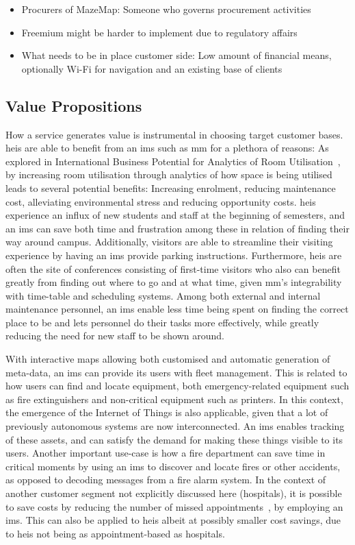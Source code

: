 \begin{itemize}
    \item Procurers of MazeMap: Someone who governs procurement activities
    \item Freemium might be harder to implement due to regulatory affairs
    \item What needs to be in place customer side: Low amount of financial means, optionally Wi-Fi for navigation and an existing base of clients
\end{itemize}

\subsection{Value Propositions}
How a service generates value is instrumental in choosing target customer bases. \glspl{hei} are able to benefit from an \gls{ims} such as \gls{mm} for a plethora of reasons: As explored in International Business Potential for Analytics of Room Utilisation~\cite{karlbernhoffbinde2015}, by increasing room utilisation through analytics of how space is being utilised leads to several potential benefits: Increasing enrolment, reducing maintenance cost, alleviating environmental stress and reducing opportunity costs. \glspl{hei} experience an influx of new students and staff at the beginning of semesters, and an \gls{ims} can save both time and frustration among these in relation of finding their way around campus. Additionally, visitors are able to streamline their visiting experience by having an \gls{ims} provide parking instructions. Furthermore, \glspl{hei} are often the site of conferences consisting of first-time visitors who also can benefit greatly from finding out where to go and at what time, given \gls{mm}'s integrability with time-table and scheduling systems. Among both external and internal maintenance personnel, an \gls{ims} enable less time being spent on finding the correct place to be and lets personnel do their tasks more effectively, while greatly reducing the need for new staff to be shown around. 


With interactive maps allowing both customised and automatic generation of meta-data, an \gls{ims} can provide its users with fleet management. This is related to how users can find and locate equipment, both emergency-related equipment such as fire extinguishers and non-critical equipment such as printers. In this context, the emergence of the Internet of Things is also applicable, given that a lot of previously autonomous systems are now interconnected. An \gls{ims} enables tracking of these assets, and can satisfy the demand for making these things visible to its users.  Another important use-case is how a fire department can save time in critical moments by using an \gls{ims} to discover and locate fires or other accidents, as opposed to decoding messages from a fire alarm system. In the context of another customer segment not explicitly discussed here (hospitals), it is possible to save costs by reducing the number of missed appointments~\cite{mazemaphosp}, by employing an \gls{ims}. This can also be applied to \glspl{hei} albeit at possibly smaller cost savings, due to \glspl{hei} not being as appointment-based as hospitals.  


